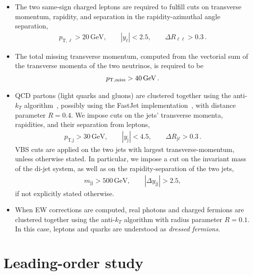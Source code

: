 \documentclass[twocolumn,epjc3]{svjour3} %
\newcommand{\Pl}{\ell}
\newcommand{\Pj}{\ensuremath{\text{j}}\xspace}
\newcommand{\GeV}{\ensuremath{\,\text{GeV}}\xspace}
\newcommand{\ptsub}[1]{\ensuremath{p_{\text{T},#1}}\xspace}
\newcommand{\etsub}[1]{\ensuremath{E_{\text{T},#1}}\xspace}
\begin{document}
     \begin{itemize} 
        \item The two same-sign charged leptons are required to fulfill cuts on transverse momentum, rapidity, and separation in the rapidity-azimuthal angle separation, 
            \begin{align}
            \label{cut:1}
             \ptsub{\Pl} >  20\GeV,\qquad |y_{\Pl}| < 2.5, \qquad \Delta R_{\Pl\Pl}> 0.3\,.
            \end{align}
        \item The total missing transverse momentum, computed from the vectorial sum of the transverse momenta of the two neutrinos, is required to be
            \begin{align}
            \label{cut:2}
              p_{\rm T, miss} >  40\GeV\,.
            \end{align}
        \item QCD partons (light quarks and gluons) are clustered together using the anti-$k_T$ algorithm~\cite{Cacciari:2008gp}, possibly using the {\sc FastJet} implementation~\cite{Cacciari:2011ma}, with distance parameter $R=0.4$. %
        We impose cuts on the jets' transverse momenta, rapidities, and their separation from leptons,  
            \begin{align}
            \label{cut:3}
             \ptsub{\Pj} >  30\GeV, \qquad |y_\Pj| < 4.5, \qquad \Delta R_{\Pj\Pl} > 0.3 \,.
            \end{align}
            VBS cuts are applied on the two jets with largest transverse-momentum, unless otherwise stated. In particular, we impose a cut on the 
             in\-vari\-ant mass of the di-jet system,  as well as on the rapidity-separation of the two jets,          \begin{align}
            \label{cut:4}
             m_{\Pj \Pj} >  500\GeV,\qquad |\Delta y_{\Pj \Pj}| > 2.5, 
            \end{align}
            if not explicitly stated otherwise. 
        \item When EW corrections are computed, real photons and charged fermions are clustered together using the anti-$k_T$ algorithm with
            radius parameter $R=0.1$. In this case, leptons and quarks are understood as {\it dressed fermions}.
     \end{itemize} 

\section{Leading-order study}
    \label{sec:LO}
\end{document}
